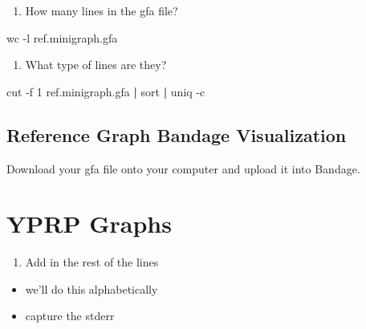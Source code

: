\documentclass[
]{book}
\newenvironment{Shaded}{\begin{snugshade}}{\end{snugshade}}
\newcommand{\AttributeTok}[1]{\textcolor[rgb]{0.77,0.63,0.00}{#1}}
\newcommand{\FunctionTok}[1]{\textcolor[rgb]{0.00,0.00,0.00}{#1}}
\newcommand{\KeywordTok}[1]{\textcolor[rgb]{0.13,0.29,0.53}{\textbf{#1}}}
\newcommand{\NormalTok}[1]{#1}
\providecommand{\tightlist}{%
  \setlength{\itemsep}{0pt}\setlength{\parskip}{0pt}}
\begin{document}
\begin{enumerate}
\def\labelenumi{\arabic{enumi}.}
\setcounter{enumi}{1}
\tightlist
\item
  How many lines in the gfa file?
\end{enumerate}

\begin{Shaded}
\begin{Highlighting}[]
\FunctionTok{wc} \AttributeTok{{-}l}\NormalTok{ ref.minigraph.gfa}
\end{Highlighting}
\end{Shaded}

\begin{enumerate}
\def\labelenumi{\arabic{enumi}.}
\setcounter{enumi}{2}
\tightlist
\item
  What type of lines are they?
\end{enumerate}

\begin{Shaded}
\begin{Highlighting}[]
\FunctionTok{cut} \AttributeTok{{-}f}\NormalTok{ 1 ref.minigraph.gfa }\KeywordTok{|} \FunctionTok{sort} \KeywordTok{|} \FunctionTok{uniq} \AttributeTok{{-}c}
\end{Highlighting}
\end{Shaded}

\hypertarget{reference-graph-bandage-visualization}{%
\subsection*{Reference Graph Bandage Visualization}\label{reference-graph-bandage-visualization}}

Download your gfa file onto your computer and upload it into Bandage.

\hypertarget{yprp-graphs}{%
\section{YPRP Graphs}\label{yprp-graphs}}

\begin{enumerate}
\def\labelenumi{\arabic{enumi}.}
\tightlist
\item
  Add in the rest of the lines
\end{enumerate}

\begin{itemize}
\tightlist
\item
  we'll do this alphabetically
\item
  capture the stderr
\end{itemize}
\end{document}
